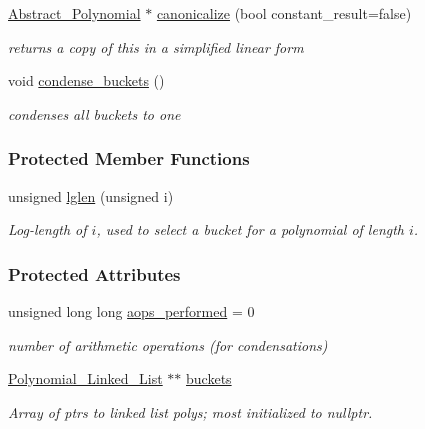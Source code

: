 \begin{Indent}
\begin{DoxyCompactItemize}
\hyperlink{group__polygroup_class_abstract___polynomial}{Abstract\+\_\+\+Polynomial} $\ast$ \hyperlink{group__polygroup_aa76d2c0dce16690b01e8a8c4862b11c5}{canonicalize} (bool constant\+\_\+result=false)
\begin{DoxyCompactList}\small\item\em returns a copy of {\ttfamily this} in a simplified linear form \end{DoxyCompactList}\item 
\mbox{\label{group__polygroup_a6ecc65eb2ee52cf7c174dd7daf9f57b3}} 
void \hyperlink{group__polygroup_a6ecc65eb2ee52cf7c174dd7daf9f57b3}{condense\+\_\+buckets} ()
\begin{DoxyCompactList}\small\item\em condenses all buckets to one \end{DoxyCompactList}\end{DoxyCompactItemize}
\end{Indent}
\subsubsection*{Protected Member Functions}
\begin{DoxyCompactItemize}
\item 
unsigned \hyperlink{group__polygroup_a82e8a9286f5c30e48c13e05d74af7fb9}{lglen} (unsigned i)
\begin{DoxyCompactList}\small\item\em Log-\/length of $i$, used to select a bucket for a polynomial of length $i$. \end{DoxyCompactList}\end{DoxyCompactItemize}
\subsubsection*{Protected Attributes}
\begin{DoxyCompactItemize}
\item 
\mbox{\label{group__polygroup_a487500b2baa783bde0b286c56130221b}} 
unsigned long long \hyperlink{group__polygroup_a487500b2baa783bde0b286c56130221b}{aops\+\_\+performed} = 0
\begin{DoxyCompactList}\small\item\em number of arithmetic operations (for condensations) \end{DoxyCompactList}\item 
\mbox{\label{group__polygroup_abfbb6cf257943fb08e03ea4601cf3134}} 
\hyperlink{group__polygroup_class_polynomial___linked___list}{Polynomial\+\_\+\+Linked\+\_\+\+List} $\ast$$\ast$ \hyperlink{group__polygroup_abfbb6cf257943fb08e03ea4601cf3134}{buckets}
\begin{DoxyCompactList}\small\item\em Array of ptrs to linked list polys; most initialized to {\ttfamily nullptr}. \end{DoxyCompactList}\end{DoxyCompactItemize}
